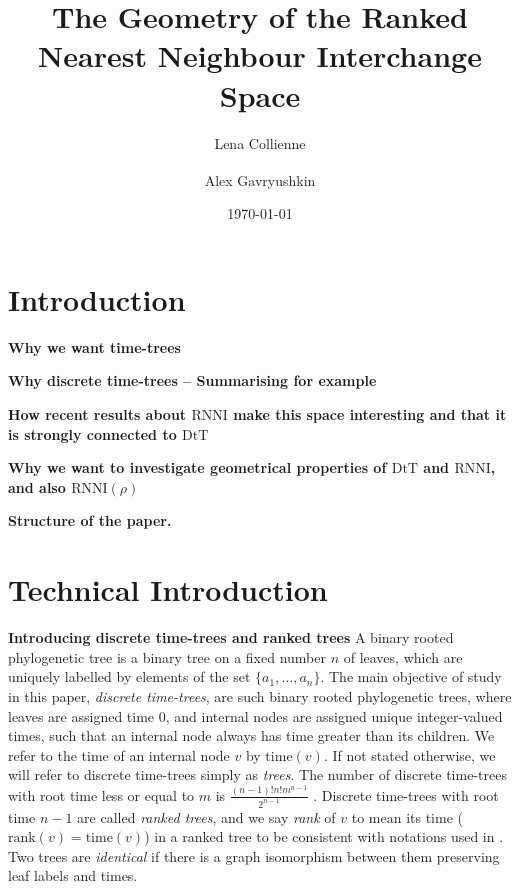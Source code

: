 \documentclass[11pt]{amsart}
\title[Geometry of ranked tree spaces]{The Geometry of the Ranked Nearest Neighbour Interchange Space}
\date{\today}
\author{Lena Collienne}
\author{Alex Gavryushkin\textsuperscript{\Letter}}
\newcommand{\rnni}{\mathrm{RNNI}}
\newcommand{\rank}{\mathrm{rank}}
\newcommand{\ntime}{\mathrm{time}}
\newcommand{\dtt}{\mathrm{DtT}}
\newcommand{\summary}[1]{\textbf{#1}} %
\begin{document}
\begin{abstract}
\end{abstract}

\maketitle


\section{Introduction}

\summary{Why we want time-trees}

\summary{Why discrete time-trees -- Summarising for example}

\summary{How recent results about $\rnni$ make this space interesting and that it is strongly connected to $\dtt$}

\summary{Why we want to investigate geometrical properties of $\dtt$ and $\rnni$, and also $\rnni(\rho)$}

\summary{Structure of the paper.}


\section{Technical Introduction}

\summary{Introducing discrete time-trees and ranked trees}
A binary rooted phylogenetic tree is a binary tree on a fixed number $n$ of leaves, which are uniquely labelled by elements of the set $\{a_1, \ldots, a_n\}$.
The main objective of study in this paper, \emph{discrete time-trees}, are such binary rooted phylogenetic trees, where leaves are assigned time $0$, and internal nodes are assigned unique integer-valued times, such that an internal node always has time greater than its children.
We refer to the time of an internal node $v$ by $\ntime(v)$.
If not stated otherwise, we will refer to discrete time-trees simply as \emph{trees}.
The number of discrete time-trees with root time less or equal to $m$ is $\frac{(n-1)!n!m^{n-1}}{2^{n-1}}$ \autocite{Gavryushkin2018-ol}.
Discrete time-trees with root time $n-1$ are called \emph{ranked trees}, and we say \emph{rank} of $v$ to mean its time ($\rank(v) = \ntime(v)$) in a ranked tree to be consistent with notations used in \autocite{Collienne2020-iu}.
Two trees are \emph{identical} if there is a graph isomorphism between them preserving leaf labels and times.
\end{document}
